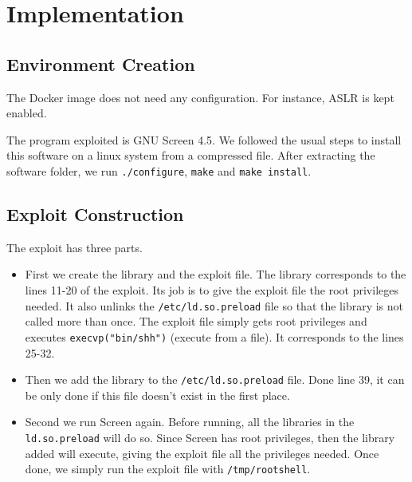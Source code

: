 \section{Implementation}
\subsection{Environment Creation}
The Docker image does not need any configuration. For instance, ASLR is kept enabled.

The program exploited is GNU Screen 4.5. We followed the usual steps to install this software on a linux system from a compressed file. After extracting the software folder, we run {\tt ./configure}, {\tt make} and {\tt make install}.

\subsection{Exploit Construction}
The exploit has three parts.

\begin{itemize}
\item First we create the library and the exploit file. The library corresponds to the lines 11-20 of the exploit. Its job is to give the exploit file the root privileges needed. It also unlinks the {\tt /etc/ld.so.preload} file so that the library is not called more than once. The exploit file simply gets root privileges and executes {\tt execvp("bin/shh")} (execute from a file). It corresponds to the lines 25-32.
\item Then we add the library to the {\tt /etc/ld.so.preload} file. Done line 39, it can be only done if this file doesn't exist in the first place.
\item Second we run Screen again. Before running, all the libraries in the {\tt ld.so.preload} will do so. Since Screen has root privileges, then the library added will execute, giving the exploit file all the privileges needed. Once done, we simply run the exploit file with {\tt /tmp/rootshell}.
\end{itemize}


